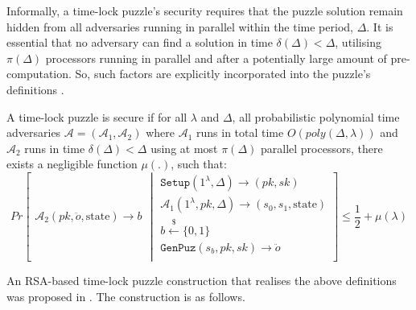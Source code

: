 Informally, a time-lock puzzle's security requires that the puzzle solution  remain hidden from all adversaries running in parallel within the time period, $\Delta$.   It is essential that no adversary can find a solution   in  time $\delta(\Delta)<\Delta$, utilising  $\pi(\Delta)$  processors running in parallel and after a potentially large amount of pre-computation. So, such factors are explicitly incorporated  into the puzzle's definitions \cite{BonehBBF18,MalavoltaT19,garay2019}. 
\begin{definition} A time-lock puzzle is secure if for all $\lambda$ and $\Delta$, all probabilistic polynomial time adversaries $\mathcal{A}=(\mathcal{A}_{\scriptscriptstyle 1},\mathcal{A}_{\scriptscriptstyle 2})$ where $\mathcal{A}_{\scriptscriptstyle 1}$ runs in total time $O(poly(\Delta,\lambda))$ and $\mathcal{A}_{\scriptscriptstyle 2}$ runs in  time $\delta(\Delta)<\Delta$ using at most $\pi(\Delta)$ parallel processors, there exists a negligible function $\mu(.)$, such that: 
\small{
$$ Pr\left[
  \begin{array}{l}
\mathcal{A}_{\scriptscriptstyle 2}(pk, \ddot{o},\text{state})  \rightarrow b
\end{array} \middle |
    \begin{array}{l}
\mathtt{Setup}(1^{\scriptscriptstyle\lambda},\Delta)\rightarrow (pk,sk)\\
\mathcal{A}_{\scriptscriptstyle 1}(1^{\scriptscriptstyle\lambda},pk, \Delta)\rightarrow (s_{\scriptscriptstyle 0},s_{\scriptscriptstyle 1},\text{state})\\
b\stackrel{\scriptscriptstyle\$}\leftarrow \{0,1\}\\
\mathtt {GenPuz}(s_{\scriptscriptstyle b}, pk, sk)\rightarrow \ddot{o}\\
\end{array}    \right]\leq \frac{1}{2}+\mu(\lambda)$$
}
\end{definition}






An  RSA-based time-lock puzzle construction that realises the above definitions was proposed in  \cite{Rivest:1996:TPT:888615}. The construction is as follows. 




